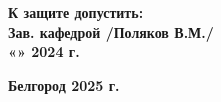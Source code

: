 \begin{titlepage}
    \vspace{2cm} 
    
    \centering
    \begin{minipage}{0.7\textwidth}
        \textbf{К защите допустить:\\
        Зав. кафедрой \underline{\hspace{4cm}} /Поляков В.М./\\
        «\underline{\hspace{1cm}}» \underline{\hspace{2cm}} 2024 г.}
    \end{minipage}
    
    \vfill
    
    \textbf{Белгород 2025 г.}
    
\end{titlepage}

